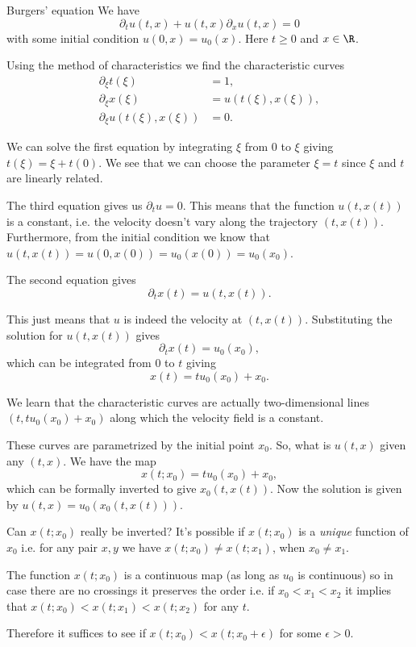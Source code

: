 \begin{frame}{Burgers' equation}
	We have
	\[ \partial_t u(t,x) + u(t,x)\partial_x u(t,x) = 0 \]
	with some initial condition $ u(0,x) = u_{0}(x) $. Here $ t \geq 0 $ and $ x \in \R $.
	
	\pause
	Using the method of characteristics we find the characteristic curves 
	\[  
	\begin{split}
		\partial_\xi t(\xi) & = 1, \\
		\partial_\xi x(\xi) & = u(t(\xi),x(\xi)), \\
		\partial_\xi u(t(\xi),x(\xi)) &= 0. 
	\end{split}
	\]
	
	\pause
	We can solve the first equation by integrating $ \xi $ from 0 to $ \xi $ giving $ t(\xi) = \xi + t(0) $. We see that we can choose the parameter $ \xi = t $ since $ \xi $ and $ t $ are linearly related.   
	
\end{frame}

\begin{frame}
	The third equation gives us $ \partial_t u = 0 $. This means that the function $ u(t,x(t)) $ is a constant, i.e. the velocity doesn't vary along the trajectory $ (t,x(t)) $. Furthermore, from the initial condition we know that $ u(t,x(t)) = u(0,x(0)) = u_0(x(0)) = u_0(x_0) $.
	
	\pause
	The second equation gives 
	\[ \partial_t x(t) = u(t,x(t)). \]
	
	\pause
	This just means that $ u $ is indeed the velocity at $ (t,x(t)) $. Substituting the solution for $ u(t,x(t)) $ gives
	\[ \partial_t x(t) = u_0(x_0), \]
	which can be integrated from $ 0 $ to $ t $ giving 
	\[ x(t) = t u_0(x_0) + x_0. \]
\end{frame}

\begin{frame}
	We learn that the characteristic curves are actually two-dimensional lines $ (t,t u_0(x_0) + x_0) $ along which the velocity field is a constant.
	
	\pause
	These curves are parametrized by the initial point $ x_0 $. So, what is $ u(t,x) $ given any $ (t,x) $. We have the map 
	\[ x(t;x_0) = t u_0(x_0) + x_0, \]
	which can be formally inverted to give $ x_0(t,x(t)) $. Now the solution is given by $ u(t,x) = u_0(x_0(t,x(t))) $.
	
	\pause
	Can $ x(t;x_0) $ really be inverted? It's possible if $ x(t;x_0) $ is a \emph{unique} function of $ x_0 $ i.e. for any pair $ x, y $ we have $ x(t;x_0) \neq x(t;x_1) $, when $ x_0 \neq x_1 $.
	
	\pause
	The function $ x(t;x_0) $ is a continuous map (as long as $ u_0 $ is continuous) so in case there are no crossings it preserves the order i.e. if $ x_0 < x_1 <x_2 $ it implies that $ x(t;x_0) < x(t;x_1) < x(t;x_2) $ for any $ t $. 
	
	\pause
	Therefore it suffices to see if $ x(t;x_0) < x(t;x_0 + \epsilon)$ for some $ \epsilon >0 $.   
\end{frame}

